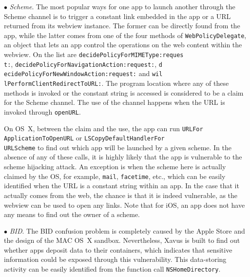 \documentclass{article}
\begin{document}
\vspace {3pt}\noindent$\bullet$\textit{ Scheme}. The most popular ways for one app to launch another through the Scheme channel is to trigger a constant link embedded in the app or a URL returned from its webview instance. The former can be directly found from the app, while the latter comes from one of the four methods of \texttt{WebPolicyDelegate}, an object that lets an app control the operations on the web content within the webview. On the list are \texttt{decidePolicyForMIMEType:reques\\t:}, \texttt{decidePolicyForNavigationAction:request:},  \texttt{d\\ecidePolicyForNewWindowAction:request:} and \texttt{wil\\lPerformClientRedirectToURL:}. The program location where any of these methods is invoked or the constant string is accessed is considered to be a claim for the Scheme channel.  The use of the channel happens when the URL is invoked through \texttt{openURL}.

On OS~X, between the claim and the use, the app can run \texttt{URLFor\\ApplicationToOpenURL} or \texttt{LSCopyDefaultHandlerFor\\URLScheme} to find out which app will be launched by a given scheme. In the absence of any of these calls, it is highly likely that the app is vulnerable to the scheme hijacking attack. An exception is when the scheme here is actually claimed by the OS, for example, \texttt{mail}, \texttt{facetime}, etc., which can be easily identified when the URL is a constant string within an app. In the case that it actually comes from the web, the chance is that it is indeed vulnerable, as the webview can be used to open any links. Note that for iOS, an app does not have any means to find out the owner of a scheme.

\vspace {3pt}\noindent$\bullet$\textit{ BID}. The BID confusion problem is completely caused by the Apple Store and the design of the MAC OS~X sandbox. Nevertheless, Xavus is built to find out whether apps deposit data to their containers, which indicates that sensitive information could be exposed through this vulnerability.  This data-storing activity can be easily identified from the function call \texttt{NSHomeDirectory}.
\end{document}
